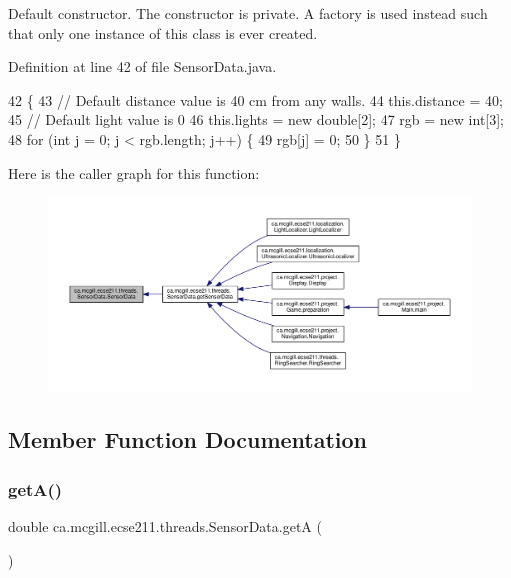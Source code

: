 Default constructor. The constructor is private. A factory is used instead such that only one instance of this class is ever created. 

Definition at line 42 of file Sensor\+Data.\+java.


\begin{DoxyCode}
42                          \{
43     \textcolor{comment}{// Default distance value is 40 cm from any walls.}
44     this.distance = 40;
45     \textcolor{comment}{// Default light value is 0}
46     this.lights = \textcolor{keyword}{new} \textcolor{keywordtype}{double}[2];
47     rgb = \textcolor{keyword}{new} \textcolor{keywordtype}{int}[3];
48     \textcolor{keywordflow}{for} (\textcolor{keywordtype}{int} j = 0; j < rgb.length; j++) \{
49       rgb[j] = 0;
50     \}
51   \}
\end{DoxyCode}
Here is the caller graph for this function\+:\nopagebreak
\begin{figure}[H]
\begin{center}
\leavevmode
\includegraphics[width=350pt]{classca_1_1mcgill_1_1ecse211_1_1threads_1_1_sensor_data_a11dcdc9c15184e05a9c84fc3958e26b6_icgraph}
\end{center}
\end{figure}


\subsection{Member Function Documentation}
\mbox{\label{classca_1_1mcgill_1_1ecse211_1_1threads_1_1_sensor_data_acc8f6cc56f39c8ea6b812cd8b135eca6}} 
\subsubsection{\texorpdfstring{get\+A()}{getA()}}
{\footnotesize\ttfamily double ca.\+mcgill.\+ecse211.\+threads.\+Sensor\+Data.\+getA (\begin{DoxyParamCaption}{ }\end{DoxyParamCaption})}

